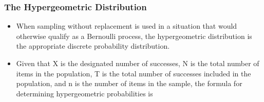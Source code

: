 \documentclass[IntroMain.tex]{subfiles}
\begin{document}
\begin{frame}
\frametitle{The Hypergeometric Distribution }	
	
	\begin{itemize}
	\item	When sampling without replacement is used in a situation that would otherwise
		qualify as a Bernoulli process, the hypergeometric distribution is the appropriate discrete probability distribution.
	\item	Given that X is the designated number of successes, N is the total number of items in the population, T is
		the total number of successes included in the population, and n is the number of items in the sample, the formula
		for determining hypergeometric probabilities is
	\end{itemize}

	
\end{frame}

\end{document}
